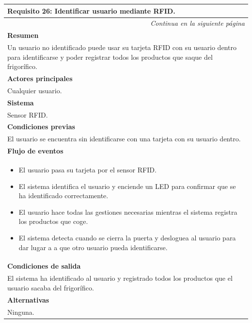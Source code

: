 \begin{longtable}{|p{}|}
\hline
 \rowcolor[gray]{.5}
 \color{white}\textbf{Requisito 26: Identificar usuario mediante RFID.} \\
\hline
\endfirsthead
\endhead
\hline \multicolumn{1}{r}{\textit{Continua en la siguiente página}} \\
\endfoot
\endlastfoot
\rowcolor[gray]{.9}
     \textbf{Resumen} \\
     \hline
     Un usuario no identificado puede usar su tarjeta RFID con su usuario dentro para identificarse y poder registrar todos los productos que saque del frigorífico. \\
     \hline
     \rowcolor[gray]{.9}
     \textbf{Actores principales} \\
     \hline
     Cualquier usuario. \\
     \hline
     \rowcolor[gray]{.9}
     \textbf{Sistema} \\
     \hline
     Sensor RFID. \\
     \hline
     \rowcolor[gray]{.9}
     \textbf{Condiciones previas} \\
     \hline
     El usuario se encuentra sin identificarse con una tarjeta con su usuario dentro. \\
     \hline
     \rowcolor[gray]{.9}
     \textbf{Flujo de eventos}  \\
     \hline
      \begin{itemize}
         \item El usuario pasa su tarjeta por el sensor RFID.
         \item El sistema identifica el usuario y enciende un LED para confirmar que se ha identificado correctamente.
         \item El usuario hace todas las gestiones necesarias mientras el sistema registra los productos que coge.
         \item El sistema detecta cuando se cierra la puerta y desloguea al usuario para dar lugar a a que otro usuario pueda identificarse. 
     \end{itemize} \\
     \hline
     \rowcolor[gray]{.9}
     \textbf{Condiciones de salida} \\
     \hline
     El sistema ha identificado al usuario y registrado todos los productos que el usuario sacaba del frigorífico. \\
     \hline
     \rowcolor[gray]{.9}
     \textbf{Alternativas}  \\
     \hline
      Ninguna. \\
     \hline
\end{longtable}

